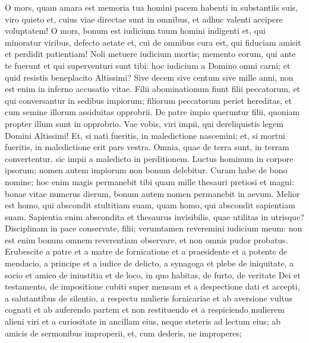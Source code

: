 \begin{biblechapter}  
\verse O mors, quam amara est memoria tua homini pacem habenti in substantiis suis, 
\verse viro quieto et, cuius viae directae sunt in omnibus, et adhuc valenti accipere voluptatem! 
\verse O mors, bonum est iudicium tuum homini indigenti et, qui minoratur viribus, 
\verse defecto aetate et, cui de omnibus cura est, qui fiduciam amisit et perdidit patientiam! 
\verse Noli metuere iudicium mortis; memento eorum, qui ante te fuerunt et qui superventuri sunt tibi: hoc iudicium a Domino omni carni; 
\verse et quid resistis beneplacito Altissimi? Sive decem sive centum sive mille anni, 
\verse non est enim in inferno accusatio vitae. 
\verse Filii abominationum fiunt filii peccatorum, et qui conversantur in sedibus impiorum; 
\verse filiorum peccatorum periet hereditas, et cum semine illorum assiduitas opprobrii. 
\verse De patre impio queruntur filii, quoniam propter illum sunt in opprobrio. 
\verse Vae vobis, viri impii, qui dereliquistis legem Domini Altissimi! 
\verse Et, si nati fueritis, in maledictione nascemini; et, si mortui fueritis, in maledictione erit pars vestra. 
\verse Omnia, quae de terra sunt, in terram convertentur, sic impii a maledicto in perditionem. 
\verse Luctus hominum in corpore ipsorum; nomen autem impiorum non bonum delebitur. 
\verse Curam habe de bono nomine; hoc enim magis permanebit tibi quam mille thesauri pretiosi et magni: 
\verse bonae vitae numerus dierum, bonum autem nomen permanebit in aevum. 
\verse Melior est homo, qui abscondit stultitiam suam, quam homo, qui abscondit sapientiam suam. Sapientia enim abscondita et thesaurus invisibilis, quae utilitas in utrisque? 
\verse Disciplinam in pace conservate, filii; 
\verse verumtamen reveremini iudicium meum: 
\verse non est enim bonum omnem reverentiam observare, et non omnis pudor probatus. 
\verse Erubescite a patre et a matre de fornicatione et a praesidente et a potente de mendacio, 
\verse a principe et a iudice de delicto, a synagoga et plebe de iniquitate, 
\verse a socio et amico de iniustitia et de loco, in quo habitas, 
\verse de furto, de veritate Dei et testamento, de impositione cubiti super mensam et a despectione dati et accepti, 
\verse a salutantibus de silentio, a respectu mulieris fornicariae et ab aversione vultus cognati 
\verse et ab auferendo partem et non restituendo 
\verse et a respiciendo mulierem alieni viri et a curiositate in ancillam eius, neque steteris ad lectum eius; 
\verse ab amicis de sermonibus improperii, et, cum dederis, ne improperes; 
\end{biblechapter}


